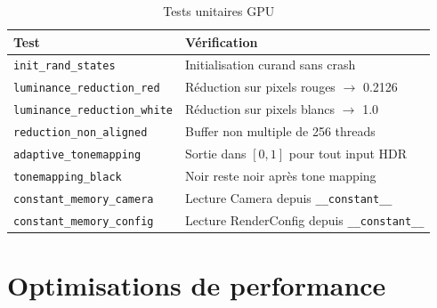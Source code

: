 \documentclass[12pt,a4paper]{article}
\begin{document}
\begin{table}[H]
\centering
\begin{tabular}{lp{8cm}}
\toprule
\textbf{Test} & \textbf{Vérification} \\
\midrule
\texttt{init\_rand\_states}            & Initialisation curand sans crash \\
\texttt{luminance\_reduction\_red}     & Réduction sur pixels rouges $\rightarrow$ 0.2126 \\
\texttt{luminance\_reduction\_white}   & Réduction sur pixels blancs $\rightarrow$ 1.0 \\
\texttt{reduction\_non\_aligned}       & Buffer non multiple de 256 threads \\
\texttt{adaptive\_tonemapping}         & Sortie dans $[0, 1]$ pour tout input HDR \\
\texttt{tonemapping\_black}            & Noir reste noir après tone mapping \\
\texttt{constant\_memory\_camera}      & Lecture Camera depuis \texttt{\_\_constant\_\_} \\
\texttt{constant\_memory\_config}      & Lecture RenderConfig depuis \texttt{\_\_constant\_\_} \\
\bottomrule
\end{tabular}
\caption{Tests unitaires GPU}
\end{table}

\section{Optimisations de performance}
\end{document}
